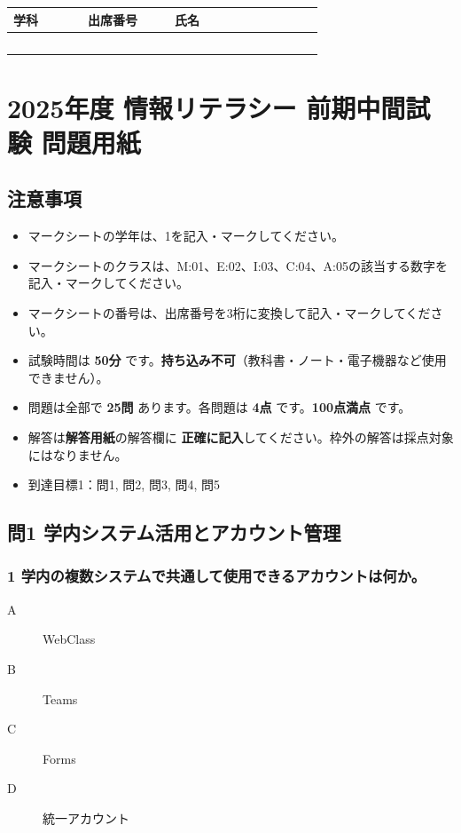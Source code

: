 \documentclass[a4paper,6pt]{jsarticle}
\begin{document}
\vspace*{-10mm}
\begin{flushright}
  \renewcommand{\arraystretch}{3} %
  \begin{tabular}{|p{2cm}|p{2cm}|p{6cm}|}
    \hline
    \textbf{学科} & \textbf{出席番号} & \textbf{氏名} \\
    \hline
      　　　　　& 　　　　　　& 　　　　　　　　　　　\\
    \hline
  \end{tabular}
\end{flushright}
\vspace{5mm}

\section*{2025年度 情報リテラシー 前期中間試験  問題用紙}

\subsection*{注意事項}

\begin{itemize}
  \item マークシートの学年は、1を記入・マークしてください。
  \item マークシートのクラスは、M:01、E:02、I:03、C:04、A:05の該当する数字を記入・マークしてください。
  \item マークシートの番号は、出席番号を3桁に変換して記入・マークしてください。
  \item 試験時間は \textbf{50分} です。\textbf{持ち込み不可}（教科書・ノート・電子機器など使用できません）。
  \item 問題は全部で \textbf{25問} あります。各問題は \textbf{4点} です。\textbf{100点満点} です。
  \item 解答は\textbf{解答用紙}の解答欄に \textbf{正確に記入}してください。枠外の解答は採点対象にはなりません。
  \item 到達目標1：問1, 問2, 問3, 問4, 問5
\end{itemize}




\subsection*{問1 学内システム活用とアカウント管理}

\subsubsection*{1 学内の複数システムで共通して使用できるアカウントは何か。}
\begin{description}
  \item[A] WebClass
  \item[B] Teams
  \item[C] Forms
  \item[D] 統一アカウント
\end{description}
\end{document}
